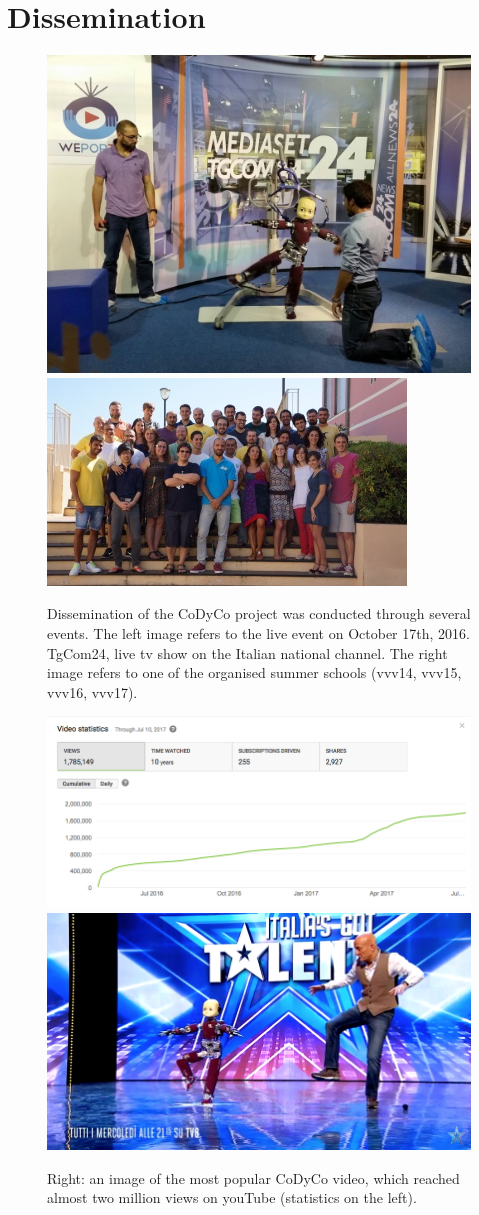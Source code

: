 \documentclass[12pt,a4paper,twoside]{article}
\begin{document}
\section{Dissemination}

\begin{figure}
  \centering
    \includegraphics[height=.25\textwidth]{images/tg24}
    \hspace{1cm}
    \includegraphics[height=.25\textwidth]{images/vvv}
  \caption{Dissemination of the CoDyCo project was conducted through several events. The left image refers to the
  live event on October 17th, 2016. TgCom24, live tv show on the Italian national channel. The right image refers to one of the organised summer schools (vvv14, vvv15, vvv16, vvv17). }
\end{figure}

\begin{figure}
  \centering
    \includegraphics[height=.2\textwidth]{images/icub_igt_stats}
    \hspace{1cm}
    \includegraphics[height=.2\textwidth]{images/icub_igt}
  \caption{Right: an image of the most popular CoDyCo video, which reached
  almost two million views on youTube (statistics on the left).}
\end{figure}
\end{document}
